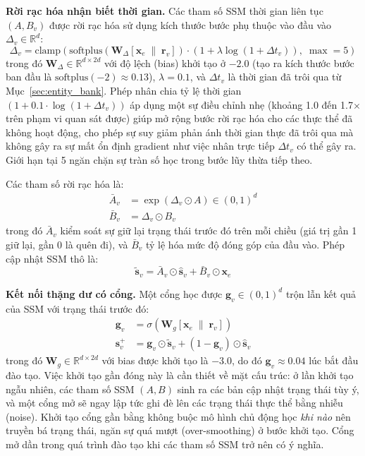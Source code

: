 \documentclass[letterpaper,twocolumn,10pt]{article}
\begin{document}
\textbf{Rời rạc hóa nhận biết thời gian.} Các tham số SSM thời gian liên tục $(A, B_v)$ được rời rạc hóa sử dụng kích thước bước phụ thuộc vào đầu vào $\Delta_v \in \mathbb{R}^d$:
\begin{equation}
    \Delta_v = \text{clamp}\!\left(\text{softplus}\!\left(\mathbf{W}_\Delta [\mathbf{x}_e \;\|\; \mathbf{r}_v]\right) \cdot \left(1 + \lambda \log(1 + \Delta t_v)\right),\; \max\!=5\right)
    \label{eq:delta}
\end{equation}
trong đó $\mathbf{W}_\Delta \in \mathbb{R}^{d \times 2d}$ với độ lệch (bias) khởi tạo ở $-2.0$ (tạo ra kích thước bước ban đầu là $\text{softplus}(-2) \approx 0.13$), $\lambda = 0.1$, và $\Delta t_v$ là thời gian đã trôi qua từ Mục~\ref{sec:entity_bank}. Phép nhân chia tỷ lệ thời gian $(1 + 0.1 \cdot \log(1 + \Delta t_v))$ áp dụng một sự điều chỉnh nhẹ (khoảng 1.0 đến 1.7$\times$ trên phạm vi quan sát được) giúp mở rộng bước rời rạc hóa cho các thực thể đã không hoạt động, cho phép sự suy giảm phản ánh thời gian thực đã trôi qua mà không gây ra sự mất ổn định gradient như việc nhân trực tiếp $\Delta t_v$ có thể gây ra. Giới hạn tại 5 ngăn chặn sự tràn số học trong bước lũy thừa tiếp theo.

Các tham số rời rạc hóa là:
\begin{align}
    \bar{A}_v &= \exp(\Delta_v \odot A) \in (0, 1)^d \label{eq:A_bar} \\
    \bar{B}_v &= \Delta_v \odot B_v \label{eq:B_bar}
\end{align}
trong đó $\bar{A}_v$ kiểm soát sự giữ lại trạng thái trước đó trên mỗi chiều (giá trị gần 1 giữ lại, gần 0 là quên đi), và $\bar{B}_v$ tỷ lệ hóa mức độ đóng góp của đầu vào. Phép cập nhật SSM thô là:
\begin{equation}
    \tilde{\mathbf{s}}_v = \bar{A}_v \odot \hat{\mathbf{s}}_v + \bar{B}_v \odot \mathbf{x}_e
    \label{eq:ssm_raw}
\end{equation}

\textbf{Kết nối thặng dư có cổng.} Một cổng học được $\mathbf{g}_v \in (0, 1)^d$ trộn lẫn kết quả của SSM với trạng thái trước đó:
\begin{align}
    \mathbf{g}_v &= \sigma\!\left(\mathbf{W}_g [\mathbf{x}_e \;\|\; \mathbf{r}_v]\right) \label{eq:gate} \\
    \mathbf{s}_v^{+} &= \mathbf{g}_v \odot \tilde{\mathbf{s}}_v + (1 - \mathbf{g}_v) \odot \hat{\mathbf{s}}_v \label{eq:gated_update}
\end{align}
trong đó $\mathbf{W}_g \in \mathbb{R}^{d \times 2d}$ với bias được khởi tạo là $-3.0$, do đó $\mathbf{g}_v \approx 0.04$ lúc bắt đầu đào tạo. Việc khởi tạo gần đóng này là cần thiết về mặt cấu trúc: ở lần khởi tạo ngẫu nhiên, các tham số SSM $(A, B)$ sinh ra các bản cập nhật trạng thái tùy ý, và một cổng mở sẽ ngay lập tức ghi đè lên các trạng thái thực thể bằng nhiễu (noise). Khởi tạo cổng gần bằng không buộc mô hình chủ động học \emph{khi nào} nên truyền bá trạng thái, ngăn sự quá mượt (over-smoothing) ở bước khởi tạo. Cổng mở dần trong quá trình đào tạo khi các tham số SSM trở nên có ý nghĩa.
\end{document}
